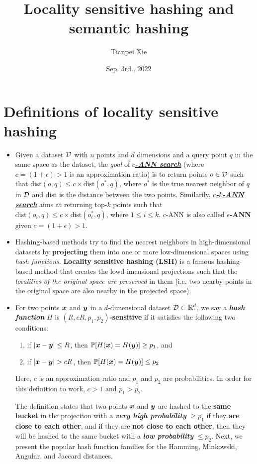 \documentclass[11pt]{article}
\begin{document}
\title{Locality sensitive hashing and semantic hashing}
\author{ Tianpei Xie}
\date{Sep. 3rd., 2022 }
\maketitle
\tableofcontents
\newpage
\allowdisplaybreaks
\section{Definitions of locality sensitive hashing}
\begin{itemize}
\item Given a dataset ${\mathcal D}$ with $n$ points and $d$ dimensions and a query point $q$ in the same space as the dataset, the \emph{goal} of \underline{\emph{\textbf{$c$-ANN search}}} (where $c = (1+\epsilon) > 1$ is an approximation ratio) is to return points $o \in {\mathcal D}$ such that $\text{dist}(o, q) \le  c \times \text{dist}(o^{*}, q)$, where $o^{*}$ is the true nearest neighbor of $q$ in ${\mathcal D}$ and $\text{dist}$ is the distance between the two points. Similarily, \underline{\textbf{\emph{$c$-$k$-ANN search}}} aims at returning top-$k$ points such that $\text{dist}(o_i, q) \le  c \times \text{dist}(o_i^{*}, q)$, where $1 \le i \le k$. \citep{jafari2021survey} $c$-ANN is also called \textbf{$\epsilon$-ANN} given $c = (1+\epsilon) > 1$.

\item Hashing-based methods try to find the nearest neighbors in high-dimensional datasets by \textbf{projecting} them into one or more low-dimensional spaces using \emph{hash functions}. \textbf{Locality sensitive hashing (LSH)} is a famous hashing-based method that creates the lowd-imensional projections such that the \emph{localities of the original space are preserved} in them (i.e. two nearby points in the original space are also nearby in the projected space).

\item For two points $\boldsymbol{x}$ and $\boldsymbol{y}$ in a $d$-dimensional dataset ${\mathcal D} \subset {\mathbb R}^{d}$, we say a \textbf{\emph{hash function}} $H$ is \textbf{$(R, cR, p_1, p_2)$-sensitive} if it satisfies the following two conditions:
\begin{enumerate}
\item if $\left\lvert \boldsymbol{x} - \boldsymbol{y} \right\rvert \le R$, then ${\mathbb P}[H(\boldsymbol{x}) = H(\boldsymbol{y})] \ge p_1$, and
\item if $\left\lvert \boldsymbol{x} - \boldsymbol{y} \right\rvert > cR$, then ${\mathbb P}[H(\boldsymbol{x}) = H(\boldsymbol{y})] \le p_2$
\end{enumerate} Here, $c$ is an approximation ratio and $p_1$ and $p_2$ are probabilities. In order for this definition to work, $c > 1$ and $p_1 > p_2$. 

The definition states that two points $\boldsymbol{x}$ and $\boldsymbol{y}$ are hashed to the \textbf{same bucket} in the projection with a \textbf{\emph{very high probability}} $\ge p_1$ if they \textbf{are close to each other}, and if they are \textbf{not close to each other}, then they will be hashed to the same bucket with a \emph{\textbf{low probability}} $\le p_2$. Next, we present the popular hash function families for the Hamming, Minkowski, Angular, and Jaccard distances.
\end{itemize}
\end{document}
